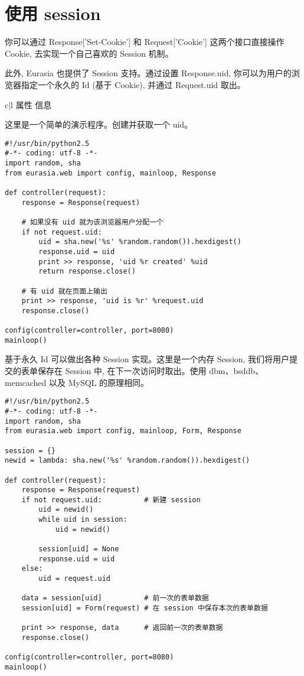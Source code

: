 \documentclass{manual}
\begin{document}
\section{使用 session}

你可以通过 Response['Set-Cookie'] 和 Request['Cookie'] 这两个接口直接操作 Cookie, 去实现一个自己喜欢的 Session 机制。

此外, Eurasia 也提供了 Session 支持。通过设置 Response.uid, 你可以为用户的浏览器指定一个永久的 Id (基于 Cookie), 并通过 Request.uid 取出。

\begin{tableii}{c|l}{}{ 属性 }{ 信息 }
\end{tableii}

这里是一个简单的演示程序。创建并获取一个 uid。

\begin{verbatim}
#!/usr/bin/python2.5
#-*- coding: utf-8 -*-
import random, sha
from eurasia.web import config, mainloop, Response

def controller(request):
	response = Response(request)

	# 如果没有 uid 就为该浏览器用户分配一个
	if not request.uid:
		uid = sha.new('%s' %random.random()).hexdigest()
		response.uid = uid
		print >> response, 'uid %r created' %uid
		return response.close()

	# 有 uid 就在页面上输出
	print >> response, 'uid is %r' %request.uid
	response.close()

config(controller=controller, port=8080)
mainloop()
\end{verbatim}

基于永久 Id 可以做出各种 Session 实现。这里是一个内存 Session, 我们将用户提交的表单保存在 Session 中, 在下一次访问时取出。使用 dbm、bsddb、memcached 以及 MySQL 的原理相同。

\begin{verbatim}
#!/usr/bin/python2.5
#-*- coding: utf-8 -*-
import random, sha
from eurasia.web import config, mainloop, Form, Response

session = {}
newid = lambda: sha.new('%s' %random.random()).hexdigest()

def controller(request):
	response = Response(request)
	if not request.uid:          # 新建 session
		uid = newid()
		while uid in session:
			uid = newid()

		session[uid] = None
		response.uid = uid
	else:
		uid = request.uid

	data = session[uid]          # 前一次的表单数据
	session[uid] = Form(request) # 在 session 中保存本次的表单数据

	print >> response, data      # 返回前一次的表单数据
	response.close()

config(controller=controller, port=8080)
mainloop()
\end{verbatim}
\end{document}
